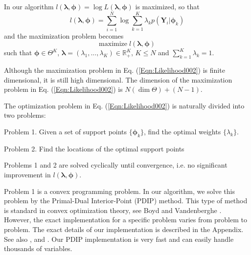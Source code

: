 In our algorithm $l(\bm{\lambda},\bm{\phi})=\log L(\bm{\lambda},\bm{\phi})$ is maximized, so that
\begin{equation}
	l(\bm{\lambda},\bm{\phi}) =\sum_{i=1}^N \log \sum_{k=1}^K  \lambda_k p\left( \bm{Y}_i \vert  \bm{\phi}_k \right)
\label{Eqn:Likelihood001b}
\end{equation}
and the maximization problem becomes
\begin{equation}
\mbox{maximize} \;  l(\bm{\lambda},\bm{\phi})
\label{Eqn:Likelihood002}
\end{equation}
such that $\bm{\phi} \in \Theta^K$, $\bm{\lambda} = ( \lambda_1, ... , \lambda_K) \in \mathbb{R}_+^K$, $K \leq N$  and \; $\sum_{k=1}^K   \lambda_k = 1$.



Although the maximization problem in Eq. (\ref{Eqn:Likelihood002}) is finite dimensional, it is still high dimensional.
%
The dimension of the maximization problem in Eq. (\ref{Eqn:Likelihood002}) is $N (\dim{\Theta}) + (N - 1)$.

The optimization problem in Eq. (\ref{Eqn:Likelihood002}) is naturally divided into two problems:

Problem 1. Given a set of support points $\{ \bm{\phi}_k\}$, find the optimal weights $\{ \lambda_k\}$.

Problem 2. Find the locations of the optimal support points 
%

Problems  1 and 2 are solved cyclically until convergence, i.e. no significant improvement in $l( \bm{\lambda},\bm{\phi})$.


Problem 1 is a convex programming problem.
%
In our algorithm, we solve this problem by the Primal-Dual Interior-Point (PDIP) method.
%
This type of method is standard in convex optimization theory, see Boyd and Vandenberghe \cite{Boyd2004}.
%
However, the exact implementation for a specific problem varies from problem to problem.
%
The exact details of our implementation is described in the Appendix.
%
See also \citet{Bell2012b:Online}, \citet{Baek2006}  and \citet{LAPK-2014-01}.
%
Our PDIP implementation is very fast and can easily handle thousands of variables.

